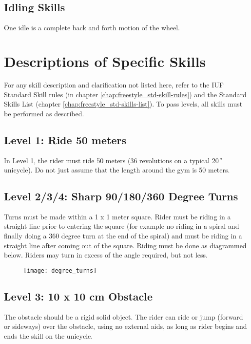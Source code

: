 \subsection{Idling Skills}
One idle is a complete back and forth motion of the wheel.

\section{Descriptions of Specific Skills}
For any skill description and clarification not listed here, refer to the IUF Standard Skill rules (in chapter \ref{chap:freestyle_std-skill-rules}) and the Standard Skills List (chapter \ref{chap:freestyle_std-skills-list}).
To pass levels, all skills must be performed as described.

\subsection{Level 1: Ride 50 meters}
In Level 1, the rider must ride 50 meters (36 revolutions on a typical 20$"$ unicycle).
Do not just assume that the length around the gym is 50 meters.

\subsection{Level 2/3/4: Sharp 90/180/360 Degree Turns}
Turns must be made within a 1 x 1 meter square.
Rider must be riding in a straight line prior to entering the square (for example no riding in a spiral and finally doing a 360 degree turn at the end of the spiral) and must be riding in a straight line after coming out of the square.
Riding must be done as diagrammed below.
Riders may turn in excess of the angle required, but not less.

\begin{figure}[h]
\begin{center}
\texttt{[image: degree\_turns]}
\end{center}
\vspace{-20pt}
\vspace{-10pt}
\end{figure}
 
\subsection{Level 3: 10 x 10 cm Obstacle}
The obstacle should be a rigid solid object.
The rider can ride or jump (forward or sideways) over the obstacle, using no external aids, as long as rider begins and ends the skill on the unicycle.

